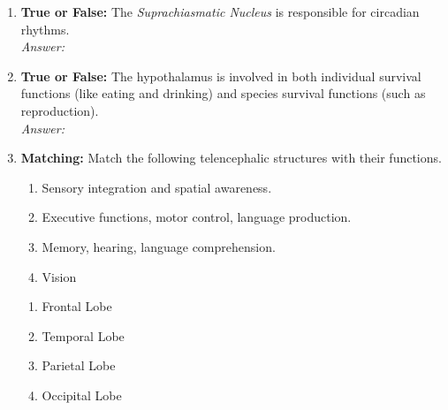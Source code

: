 \begin{enumerate}[label=\textbf{Q1.10.\arabic*}]
      \item \textbf{True or False:} The \textit{Suprachiasmatic Nucleus} is responsible for circadian rhythms. \\
            \textit{Answer:} %

      \item \textbf{True or False:} The hypothalamus is involved in both individual survival functions (like eating and drinking) and species survival functions (such as reproduction). \\
            \textit{Answer:} %

      \item \textbf{Matching:} Match the following telencephalic structures with their functions.
            \begin{wordbox}
                  \begin{enumerate}[label=(\roman*)]
                        \item Sensory integration and spatial awareness.
                        \item Executive functions, motor control, language production.
                        \item Memory, hearing, language comprehension.
                        \item Vision
                  \end{enumerate}
            \end{wordbox}
            \begin{enumerate}[label=(\alph*)]
                  \item Frontal Lobe \quad \dotfill \quad \underline{\hspace{3cm}}\\[0.5em]
                  \item Temporal Lobe \quad \dotfill \quad \underline{\hspace{3cm}}\\[0.5em]
                  \item Parietal Lobe \quad \dotfill \quad \underline{\hspace{3cm}}\\[0.5em]
                  \item Occipital Lobe \quad \dotfill \quad \underline{\hspace{3cm}}
            \end{enumerate}


\end{enumerate}
